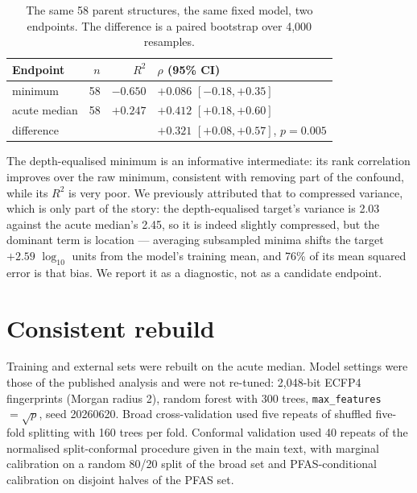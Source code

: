 \documentclass[11pt]{article}
\begin{document}
\begin{table}[h]
\centering
\caption{The same 58 parent structures, the same fixed model, two endpoints.
The difference is a paired bootstrap over 4{,}000 resamples.}
\small
\begin{tabular}{lrrl}
\toprule
Endpoint & $n$ & $R^2$ & $\rho$ (95\% CI) \\
\midrule
minimum      & 58 & $-0.650$ & $+0.086$ $[-0.18,+0.35]$ \\
acute median & 58 & $+0.247$ & $+0.412$ $[+0.18,+0.60]$ \\
\midrule
difference   &    &          & $+0.321$ $[+0.08,+0.57]$, $p=0.005$ \\
\bottomrule
\end{tabular}
\end{table}

The depth-equalised minimum is an informative intermediate: its rank correlation
improves over the raw minimum, consistent with removing part of the confound,
while its $R^2$ is very poor. We previously attributed that to compressed
variance, which is only part of the story: the depth-equalised target's variance
is 2.03 against the acute median's 2.45, so it is indeed slightly compressed,
but the dominant term is location --- averaging subsampled minima shifts the
target $+2.59$ $\log_{10}$ units from the model's training mean, and 76\% of its
mean squared error is that bias. We report it as a diagnostic, not as a candidate
endpoint.

\section{Consistent rebuild}

Training and external sets were rebuilt on the acute median. Model settings were
those of the published analysis and were not re-tuned: 2{,}048-bit ECFP4
fingerprints (Morgan radius 2), random forest with 300 trees,
\texttt{max\_features} $=\sqrt{p}$, seed 20260620. Broad cross-validation used
five repeats of shuffled five-fold splitting with 160 trees per fold. Conformal
validation used 40 repeats of the normalised split-conformal procedure given in
the main text, with marginal calibration on a random 80/20 split of the broad
set and PFAS-conditional calibration on disjoint halves of the PFAS set.
\end{document}
